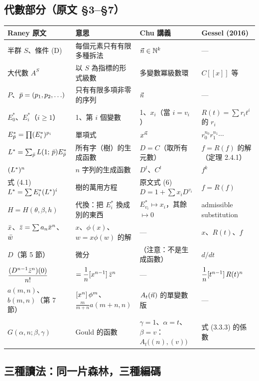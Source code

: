 \subsection{代數部分（原文 §3--§7）}

{\small
\renewcommand{\arraystretch}{1.25}
\begin{longtable}{@{}>{\raggedright}p{3.1cm}>{\raggedright}p{3.9cm}>{\raggedright}p{4.1cm}>{\raggedright\arraybackslash}p{3.6cm}@{}}
\toprule
Raney 原文 & 意思 & Chu 講義 & Gessel (2016)\\
\midrule
\endhead
半群 $S$、條件 (D) & 每個元素只有有限多種拆法 & $\vec n\in\mathbb N^k$ & —\\
大代數 $A^S$ & 以 $S$ 為指標的形式級數 & 多變數冪級數環 & $C[[x]]$ 等\\
$P$、$\bar p=(p_1,p_2,\ldots)$ & 只有有限多項非零的序列 & $\vec n$ & —\\
$E_0^*$、$E_i^*$（$i\ge1$） & 1、第 $i$ 個變數 & 1、$x_i$（當 $i=v_i$） & $R(t)=\sum r_it^i$ 的 $r_i$\\
$E^*_{\bar p}=\prod(E_i^*)^{p_i}$ & 單項式 & $x^{\vec n}$ & $r_0^{n_0}r_1^{n_1}\cdots$\\
$L^{*}=\sum_{\bar p}L(1;\,\bar p)E^*_{\bar p}$ & 所有字（樹）的生成函數 & $D=C$（取所有元數） & $f=R(f)$ 的解（定理 2.4.1）\\
$(L^{*})^n$ & $n$ 字列的生成函數 & $D^t$、$C^t$ & $f^k$\\
式 (4.1) $L^{*}=\sum E_i^*(L^{*})^i$ & 樹的萬用方程 & 原文式 (6) $D=1+\sum x_iD^{v_i}$ & $f=R(f)$\\
$H=H(\theta,\beta,h)$ & 代換：把 $E_i^*$ 換成別的東西 & $E^*_{v_i}\mapsto x_i$，其餘 $\mapsto0$ & admissible substitution\\
$\bar x$、$\bar z=\sum a_n\bar x^n$、$\bar w$ & $x$、$\phi(x)$、$w=x\phi(w)$ 的解 & — & $x$、$R(t)$、$f$\\
$D$（第 5 節） & 微分 & （注意：不是生成函數） & $d/dt$\\
$\dfrac{(D^{n-1}\bar z^n)(0)}{n!}$ & $=\dfrac1n[x^{n-1}]\,\bar z^n$ & — & $\dfrac1n[t^{n-1}]\,R(t)^n$\\
$a(m,n)$、$b(m,n)$（第 7 節） & $[x^n]\,\phi^m$、$\frac m{m+n}a(m+n,n)$ & $A_t(\vec n)$ 的單變數版 & —\\
$G(\alpha,n;\beta,\gamma)$ & Gould 的函數 & $\gamma=1$、$\alpha=t$、$\beta=v$：$A_t\big((n),(v)\big)$ & 式 (3.3.3) 的係數\\
\bottomrule
\end{longtable}
}

\subsection{三種讀法：同一片森林，三種編碼}

